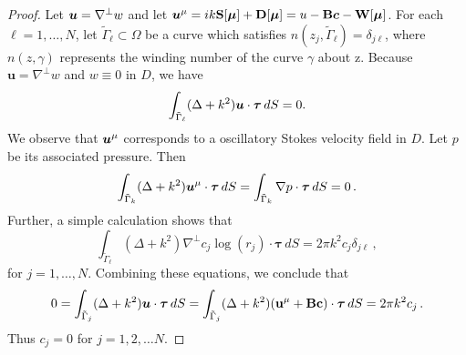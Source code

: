 \begin{proof}
Let ${\boldsymbol u} = \nabla^{\perp} w$ and let 
${\boldsymbol u}^{\mu} = ik \mathbf{S} [{\boldsymbol \mu}] + \mathbf{D}[{\boldsymbol \mu}] = u 
-\mathbf{B} {\boldsymbol c} - \mathbf{W}[{\boldsymbol \mu}]$.
For each $\ell = 1,\ldots,N$, 
let $\tilde{\Gamma}_{\ell} \subset \Omega$ be a curve which satisfies 
$n\left(z_{j}, \tilde{\Gamma}_{\ell}\right) = \delta_{j\ell}$, 
where $n\left(z,\gamma\right)$ represents the winding number 
of the curve $\gamma$ about z. 
Because $\mathbf{u} = \nabla^{\perp} w$ and $w\equiv 0$ in $D$,
we have 
\begin{equation}
\int_{\tilde{\Gamma}_\ell} (\Delta + k^2) {\boldsymbol u} \cdot \boldsymbol{\tau} \, dS = 0 .
\end{equation}
We observe that ${\boldsymbol u}^\mu$ corresponds
to a oscillatory Stokes velocity field in $D$. Let $p$ be 
its associated pressure. Then
\begin{equation}
\int_{\tilde{\Gamma}_k} (\Delta+k^2) {\boldsymbol u}^\mu 
\cdot \boldsymbol{\tau}
\, dS = \int_{\tilde{\Gamma}_k} \nabla p \cdot \boldsymbol{\tau} \, dS = 0 \, .
\end{equation}
Further, a simple calculation shows that 
\begin{equation}
\int_{\tilde{\Gamma}_\ell} (\Delta + k^{2}) \nabla^{\perp} c_j 
\log (r_j) \cdot \boldsymbol{\tau} \, dS = 
2 \pi k^2 c_{j} \delta_{j\ell} \, ,
\end{equation}
for $j = 1, \ldots, N$.
Combining these equations, we conclude that
\begin{equation}
0 = \int_{\tilde{\Gamma}_j} (\Delta +k^2) {\boldsymbol u} \cdot 
\boldsymbol{\tau} \, dS =
\int_{\tilde{\Gamma}_j} (\Delta +k^2)( \mathbf{u}^\mu + \mathbf{B}\mathbf{c} )
\cdot \boldsymbol{\tau} \, dS =  
2\pi k^2 c_j \, .
\end{equation}
Thus $c_j = 0$ for $j=1,2,\ldots N$.


\end{proof}
